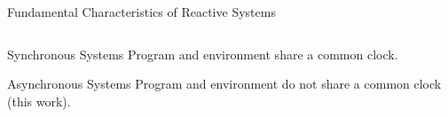 \documentclass{beamer}
\begin{document}
\begin{frame}{Fundamental Characteristics of Reactive Systems}
\begin{columns}
\begin{column}{.5\textwidth}
{        \begin{block}{Synchronous Systems}
          Program and environment share a common clock.
        \end{block}

        \begin{block}{Asynchronous Systems}
          Program and environment do not share a common clock (this work).
        \end{block}
      }


    \end{column}
  \end{columns}

\end{frame}
\end{document}
